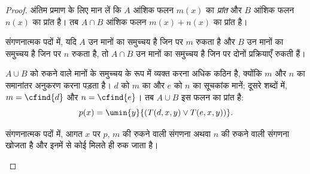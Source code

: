 \documentclass[../../../include/open-logic-section]{subfiles}
\begin{document}
\begin{proof}
अंतिम प्रमाण के लिए मान लें कि $A$ आंशिक फलन $m(x)$ का \emph{प्रांत}
और $B$ आंशिक फलन $n(x)$ का प्रांत है। तब $A \cap B$ आंशिक फलन
$m(x) +
n(x)$ का प्रांत है।

\begin{explain}
संगणनात्मक पदों में, यदि $A$ उन मानों का समुच्चय है जिन पर $m$ रुकता है
और $B$ उन मानों का समुच्चय है जिन पर $n$ रुकता है, तो $A \cap B$ उन
मानों का समुच्चय है जिन पर दोनों प्रक्रियाएँ रुकती हैं।
\end{explain}

$A \cup B$ को रुकने वाले मानों के समुच्चय के रूप में व्यक्त करना अधिक
कठिन है, क्योंकि $m$ और $n$ का समानांतर अनुकरण करना पड़ता है। $d$ को
$m$ का और $e$ को $n$ का सूचकांक मानें; दूसरे शब्दों में, $m =
\cfind{d}$
और $n = \cfind{e}$। तब $A \cup B$ इस फलन का प्रांत है:
\[
p(x) = \umin{y}{(T(d,x,y) \lor T(e,x,y))}.
\]
\begin{explain}
संगणनात्मक पदों में, आगत $x$ पर $p$, $m$ की रुकने वाली संगणना अथवा $n$
की रुकने वाली संगणना खोजता है और इनमें से कोई मिलते ही रुक जाता है।
\end{explain}
\end{proof}
\end{document}
